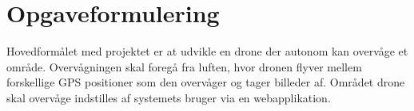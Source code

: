\chapter{Opgaveformulering}
\label{chap:opgaveformulering}

Hovedformålet med projektet er at udvikle en drone der autonom kan overvåge et område. Overvågningen skal foregå fra luften, hvor dronen flyver mellem forskellige GPS positioner som den overvåger og tager billeder af. Området drone skal overvåge indstilles af systemets bruger via en webapplikation.

